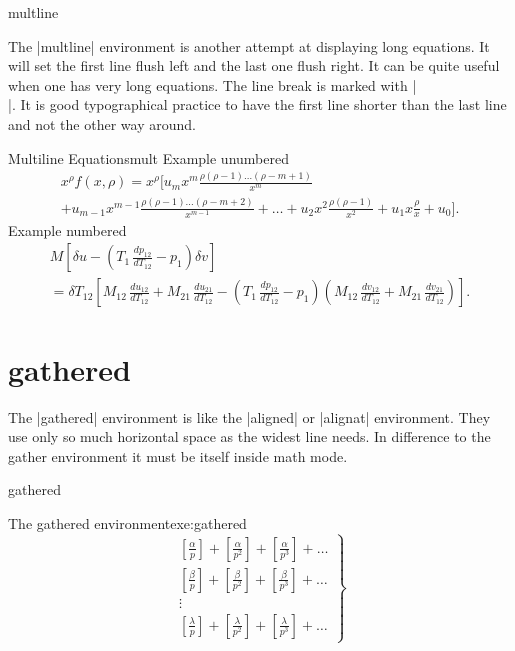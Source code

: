 \begin{docEnvironment}{multline}{}
\end{docEnvironment}
The |multline| environment is another attempt at displaying long equations. It will set the first line flush left and the last one flush right. It can be quite useful when one has very long equations. The line break is marked with |\\|. It is good typographical practice to have the first line shorter than the last line and not the other way around.

\begin{texexample}{Multiline Equations}{mult}
Example unumbered
\begin{multline*}
x^{\rho}f(x, \rho) = x^{\rho} \Big [ u_{m}x^{m}\frac{\rho(\rho-1)\ldots (\rho-m+1)}{x^{m}} \\
                   + u_{m-1}x^{m-1}\frac{\rho(\rho-1)\ldots (\rho-m+2)}{x^{m-1}}+ \ldots
                   + u_{2}x^{2}\frac{\rho(\rho-1)}{x^2}+u_{1}x\frac{\rho}{x}+u_0 \Big ].
\end{multline*}
Example  numbered
\begin{multline}
M \left[\delta u - \left(T_1\, \frac{dp_{12}}{dT_{12}} - p_1\right) \delta v\right] \\
= \delta T_{12} \left[M_{12}\, \frac{du_{12}}{dT_{12}} + M_{21}\, \frac{du_{21}}{dT_{12}}
  - \left(T_1\, \frac{dp_{12}}{dT_{12}} - p_1\right)
    \left(M_{12}\, \frac{dv_{12}}{dT_{12}}
        + M_{21}\, \frac{dv_{21}}{dT_{12}}\right)\right].
\end{multline}
\end{texexample}



\section{gathered}

The |gathered| environment is like the |aligned| or |alignat| environment. They use
only so much horizontal space as the widest line needs. In difference to the gather
environment it must be itself inside math mode.

\begin{docEnvironment}{gathered}{}
\end{docEnvironment}

\begin{texexample}{The gathered environment}{exe:gathered}
\[
  \left .
   \begin{gathered}
    \left [ \frac{\alpha}{p} \right ] +
    \left [ \frac{\alpha}{p^2} \right ] +
    \left [ \frac{\alpha}{p^3} \right ] +
    \ldots \\
    \left [ \frac{\beta}{p} \right ] +
    \left [ \frac{\beta}{p^2} \right ] +
    \left [ \frac{\beta}{p^3} \right ] +
    \ldots \\
      \vdots \\
    \left [ \frac{\lambda}{p} \right ] +
    \left [ \frac{\lambda}{p^2} \right ] +
    \left [ \frac{\lambda}{p^3} \right ] +
    \ldots
   \end{gathered}
  \right \} \tag{B}
\]
\end{texexample}

